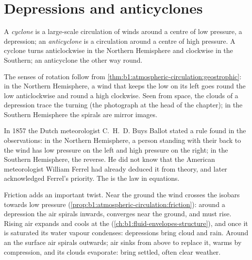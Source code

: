 \section{Depressions and anticyclones}\label{sec:b1:atmospheric-circulation:cyclones}

\begin{definition}\label{def:b1:atmospheric-circulation:cyclone}
A \emph{cyclone} is a large-scale circulation of winds around a centre
of low pressure, a depression; an \emph{anticyclone} is a
circulation around a centre of high pressure. A cyclone turns anticlockwise in the
Northern Hemisphere and clockwise in the Southern; an anticyclone the other way
round.
\end{definition}

The senses of rotation follow from \cref{thm:b1:atmospheric-circulation:geostrophic}:
in the Northern Hemisphere, a wind that keeps the low on its left goes round the low
anticlockwise and round a high clockwise. Seen from space, the clouds of a
depression trace the turning (the photograph at the head of the chapter); in the
Southern Hemisphere the spirals are mirror images.

\begin{history}
In 1857 the Dutch meteorologist C.~H.~D. Buys Ballot stated a rule found in the
observations: in the Northern Hemisphere, a person standing with their back to the
wind has low pressure on the left and high pressure on the right; in the Southern
Hemisphere, the reverse. He did not know that the American meteorologist William
Ferrel had already deduced it from theory, and later acknowledged Ferrel's priority.
The  is the law in equations.
\end{history}

Friction adds an important twist. Near the ground the wind crosses the isobars
towards low pressure (\cref{prop:b1:atmospheric-circulation:friction}): around a
depression the air spirals inwards, converges near the ground, and must rise. Rising
air expands and cools at the 
(\cref{ch:b1:fluid-envelopes-structure}), and once it is saturated its water vapour
condenses: depressions bring cloud and rain. Around an  the surface air
spirals outwards; air sinks from above to replace it, warms by compression, and
its clouds evaporate:  bring settled, often clear weather.

